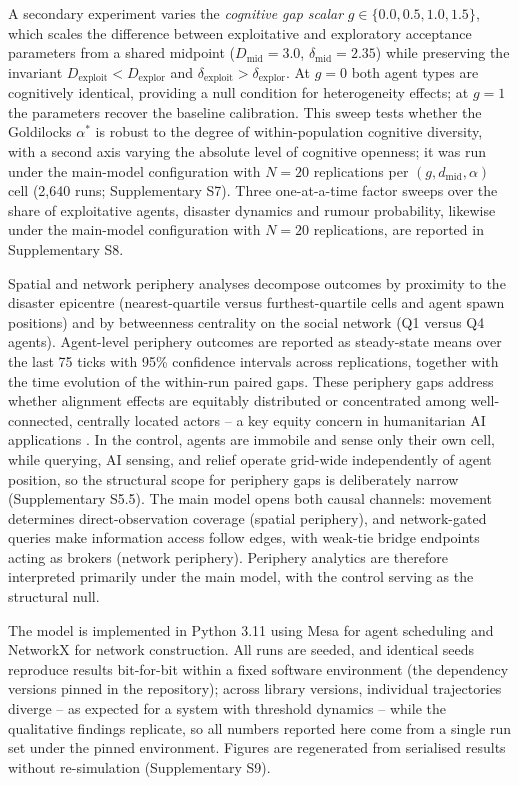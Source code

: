 \documentclass[pdflatex,sn-nature]{sn-jnl}
\begin{document}
A secondary experiment varies the \emph{cognitive gap scalar} $g \in \{0.0, 0.5, 1.0, 1.5\}$, which scales the difference between exploitative and exploratory acceptance parameters from a shared midpoint ($D_{\text{mid}} = 3.0$, $\delta_{\text{mid}} = 2.35$) while preserving the invariant $D_{\text{exploit}} < D_{\text{explor}}$ and $\delta_{\text{exploit}} > \delta_{\text{explor}}$. At $g = 0$ both agent types are cognitively identical, providing a null condition for heterogeneity effects; at $g = 1$ the parameters recover the baseline calibration. This sweep tests whether the Goldilocks $\alpha^{*}$ is robust to the degree of within-population cognitive diversity, with a second axis varying the absolute level of cognitive openness; it was run under the main-model configuration with $N = 20$ replications per $(g, d_{\text{mid}}, \alpha)$ cell (2{,}640 runs; Supplementary S7). Three one-at-a-time factor sweeps over the share of exploitative agents, disaster dynamics and rumour probability, likewise under the main-model configuration with $N = 20$ replications, are reported in Supplementary S8.

Spatial and network periphery analyses decompose outcomes by proximity to the disaster epicentre (nearest-quartile versus furthest-quartile cells and agent spawn positions) and by betweenness centrality on the social network (Q1 versus Q4 agents). Agent-level periphery outcomes are reported as steady-state means over the last 75 ticks with 95\% confidence intervals across replications, together with the time evolution of the within-run paired gaps. These periphery gaps address whether alignment effects are equitably distributed or concentrated among well-connected, centrally located actors -- a key equity concern in humanitarian AI applications \citep{coleman2024weaving}. In the control, agents are immobile and sense only their own cell, while querying, AI sensing, and relief operate grid-wide independently of agent position, so the structural scope for periphery gaps is deliberately narrow (Supplementary S5.5). The main model opens both causal channels: movement determines direct-observation coverage (spatial periphery), and network-gated queries make information access follow edges, with weak-tie bridge endpoints acting as brokers (network periphery). Periphery analytics are therefore interpreted primarily under the main model, with the control serving as the structural null.

The model is implemented in Python 3.11 using Mesa for agent scheduling and NetworkX for network construction. All runs are seeded, and identical seeds reproduce results bit-for-bit within a fixed software environment (the dependency versions pinned in the repository); across library versions, individual trajectories diverge -- as expected for a system with threshold dynamics -- while the qualitative findings replicate, so all numbers reported here come from a single run set under the pinned environment. Figures are regenerated from serialised results without re-simulation (Supplementary S9).
\end{document}

